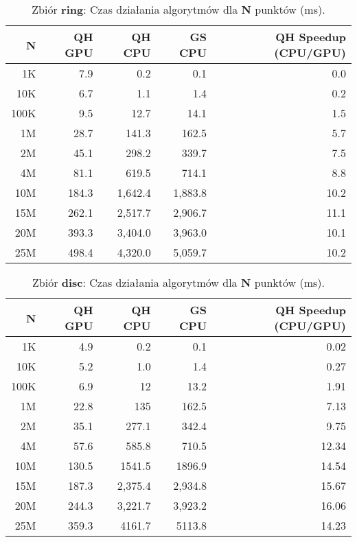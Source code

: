 \documentclass[11pt]{article}
\begin{document}
    \begin{table}[H]
        \centering
        \begin{tabular}{r|r|r|r|r}
\textbf{N} & \textbf{QH GPU} & \textbf{QH CPU} & \textbf{GS CPU} & \textbf{QH Speedup (CPU/GPU)} \\ \hline
1K & 7.9 & 0.2 & 0.1 & 0.0 \\ \hline
10K & 6.7 & 1.1 & 1.4 & 0.2 \\ \hline
100K & 9.5 & 12.7 & 14.1 & 1.5 \\ \hline
1M & 28.7 & 141.3 & 162.5 & 5.7 \\ \hline
2M & 45.1 & 298.2 & 339.7 & 7.5 \\ \hline
4M & 81.1 & 619.5 & 714.1 & 8.8 \\ \hline
10M & 184.3 & 1,642.4 & 1,883.8 & 10.2 \\ \hline
15M & 262.1 & 2,517.7 & 2,906.7 & 11.1 \\ \hline
20M & 393.3 & 3,404.0 & 3,963.0 & 10.1 \\ \hline
25M & 498.4 & 4,320.0 & 5,059.7 & 10.2
        \end{tabular}
        \caption{Zbiór \textbf{ring}: Czas działania algorytmów dla \textbf{N} punktów (ms).}
    \end{table}
    
    \begin{table}[H]
        \centering
        \begin{tabular}{r|r|r|r|r}
\textbf{N} & \textbf{QH GPU} & \textbf{QH CPU} & \textbf{GS CPU} & \textbf{QH Speedup (CPU/GPU)} \\ \hline
1K & 4.9 & 0.2 & 0.1 & 0.02 \\ \hline
10K & 5.2 & 1.0 & 1.4 & 0.27 \\ \hline
100K & 6.9 & 12 & 13.2 & 1.91 \\ \hline
1M & 22.8 & 135 & 162.5 & 7.13 \\ \hline
2M & 35.1 & 277.1 & 342.4 & 9.75 \\ \hline
4M & 57.6 & 585.8 & 710.5 & 12.34 \\ \hline
10M & 130.5 & 1541.5 & 1896.9 & 14.54 \\ \hline
15M & 187.3 & 2,375.4 & 2,934.8 & 15.67 \\ \hline
20M & 244.3 & 3,221.7 & 3,923.2 & 16.06 \\ \hline
25M & 359.3 & 4161.7 & 5113.8 & 14.23
        \end{tabular}
        \caption{Zbiór \textbf{disc}: Czas działania algorytmów dla \textbf{N} punktów (ms).}
    \end{table}
    
\end{document}
